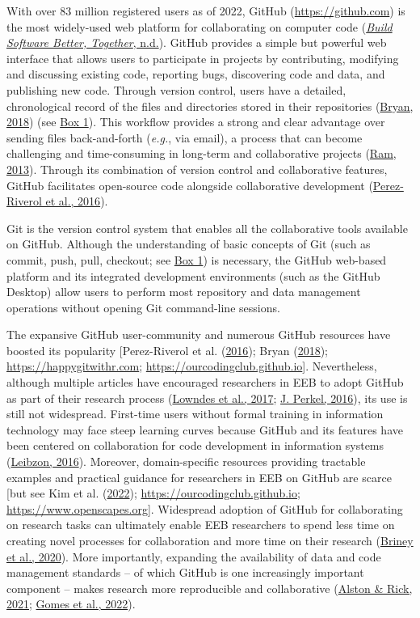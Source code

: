With over 83 million registered users as of 2022, GitHub (\url{https://github.com}) is the most widely-used web platform for collaborating on computer code (\protect\hyperlink{ref-nwCtHDCn}{\emph{Build Software Better, Together}, n.d.}).
GitHub provides a simple but powerful web interface that allows users to participate in projects by contributing, modifying and discussing existing code, reporting bugs, discovering code and data, and publishing new code.
Through version control, users have a detailed, chronological record of the files and directories stored in their repositories (\protect\hyperlink{ref-RVetqmsg}{Bryan, 2018}) (see \protect\hyperlink{definitions}{Box 1}).
This workflow provides a strong and clear advantage over sending files back-and-forth (\emph{e.g.}, via email), a process that can become challenging and time-consuming in long-term and collaborative projects (\protect\hyperlink{ref-4ny1onB0}{Ram, 2013}).
Through its combination of version control and collaborative features, GitHub facilitates open-source code alongside collaborative development (\protect\hyperlink{ref-kEX5dgzK}{Perez-Riverol et al., 2016}).

Git is the version control system that enables all the collaborative tools available on GitHub.
Although the understanding of basic concepts of Git (such as commit, push, pull, checkout; see \protect\hyperlink{definitions}{Box 1}) is necessary, the GitHub web-based platform and its integrated development environments (such as the GitHub Desktop) allow users to perform most repository and data management operations without opening Git command-line sessions.

The expansive GitHub user-community and numerous GitHub resources have boosted its popularity {[}Perez-Riverol et al. (\protect\hyperlink{ref-kEX5dgzK}{2016}); Bryan (\protect\hyperlink{ref-RVetqmsg}{2018}); \url{https://happygitwithr.com}; \url{https://ourcodingclub.github.io}{]}.
Nevertheless, although multiple articles have encouraged researchers in EEB to adopt GitHub as part of their research process (\protect\hyperlink{ref-3DKwn1sY}{Lowndes et al., 2017}; \protect\hyperlink{ref-10ghgV3S8}{J. Perkel, 2016}), its use is still not widespread.
First-time users without formal training in information technology may face steep learning curves because GitHub and its features have been centered on collaboration for code development in information systems (\protect\hyperlink{ref-139b0pSGc}{Leibzon, 2016}).
Moreover, domain-specific resources providing tractable examples and practical guidance for researchers in EEB on GitHub are scarce {[}but see Kim et al. (\protect\hyperlink{ref-lJAgyhYq}{2022}); \url{https://ourcodingclub.github.io}; \url{https://www.openscapes.org}{]}.
Widespread adoption of GitHub for collaborating on research tasks can ultimately enable EEB researchers to spend less time on creating novel processes for collaboration and more time on their research (\protect\hyperlink{ref-ydrk01SR}{Briney et al., 2020}).
More importantly, expanding the availability of data and code management standards -- of which GitHub is one increasingly important component -- makes research more reproducible and collaborative (\protect\hyperlink{ref-13QX8XU3J}{Alston \& Rick, 2021}; \protect\hyperlink{ref-pq2Tv1BC}{Gomes et al., 2022}).

